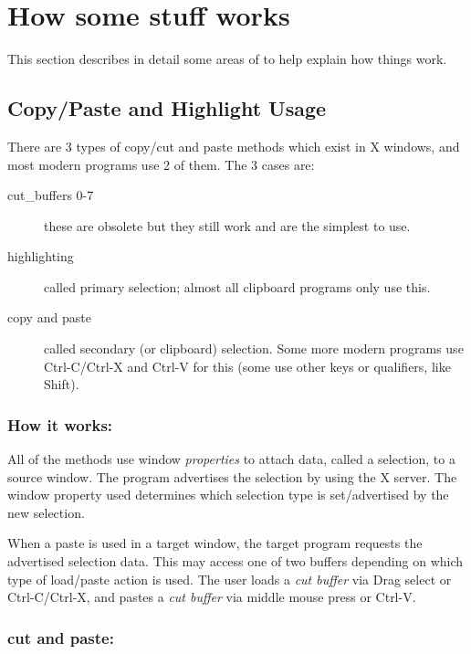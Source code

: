 \chapter{How some stuff works}%
\label{cha:how_stuff_works}

This section describes in detail some areas of \CGG{} to help explain how things work.

\section{Copy/Paste and Highlight Usage}%
\label{sec:copy_paste_highlight_usage}

There are 3 types of copy/cut and paste methods which exist in X windows, and most modern programs use 2 of them.  The 3 cases are:

\begin{description}
    \item[cut\_buffers 0-7] these are obsolete but they still work and are the simplest to use.
    \item[highlighting] called primary selection; almost all clipboard programs only use this.
    \item[copy and paste] called secondary (or clipboard) selection. Some more modern programs use Ctrl-C/Ctrl-X and Ctrl-V for this (some use other keys or qualifiers, like Shift).
\end{description}

\subsection*{How it works:}%
\label{sub:how_it_works}

All of the methods use window \textit{properties} to attach data, called a selection, to a source window.  The program advertises the selection by using the X server.  The window property used determines which selection type is set/advertised by the new selection.

When a paste is used in a target window, the target program requests the advertised selection data.  This may access one of two buffers depending on which type of load/paste action is used.  The user loads a \textit{cut buffer} via Drag select or Ctrl-C/Ctrl-X, and pastes a \textit{cut buffer} via middle mouse press or Ctrl-V.

\subsection*{\CGG{} cut and paste:}%
\label{sub:cinelerra_cut_paste}

